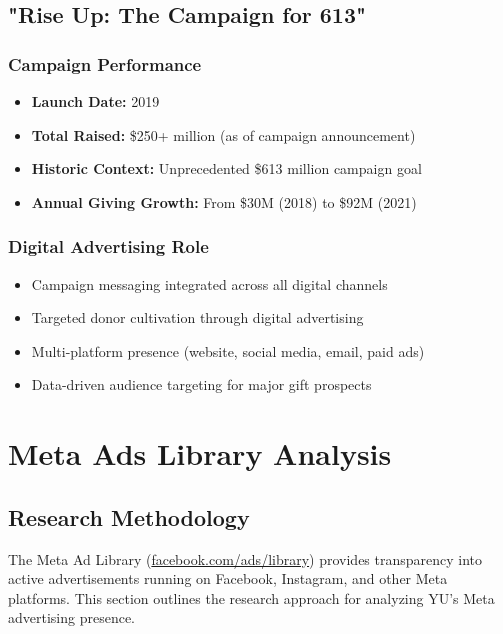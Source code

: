 \documentclass[12pt,letterpaper]{article}
\begin{document}
\subsection{"Rise Up: The Campaign for 613"}

\subsubsection{Campaign Performance}
\begin{itemize}[leftmargin=*]
    \item \textbf{Launch Date:} 2019
    \item \textbf{Total Raised:} \$250+ million (as of campaign announcement)
    \item \textbf{Historic Context:} Unprecedented \$613 million campaign goal
    \item \textbf{Annual Giving Growth:} From \$30M (2018) to \$92M (2021)
\end{itemize}

\subsubsection{Digital Advertising Role}
\begin{itemize}[leftmargin=*]
    \item Campaign messaging integrated across all digital channels
    \item Targeted donor cultivation through digital advertising
    \item Multi-platform presence (website, social media, email, paid ads)
    \item Data-driven audience targeting for major gift prospects
\end{itemize}

\section{Meta Ads Library Analysis}

\subsection{Research Methodology}

The Meta Ad Library (\url{facebook.com/ads/library}) provides transparency into active advertisements running on Facebook, Instagram, and other Meta platforms. This section outlines the research approach for analyzing YU's Meta advertising presence.
\end{document}
